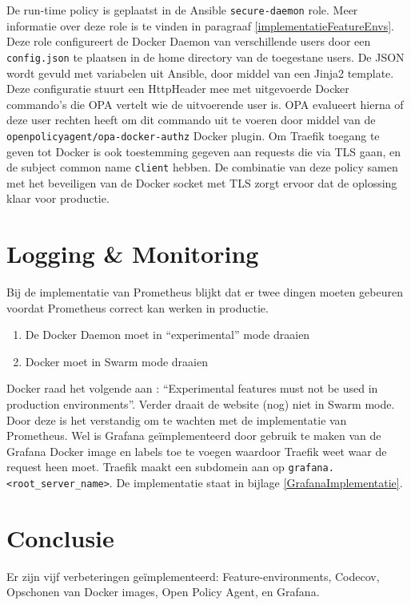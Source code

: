 De run-time policy is geplaatst in de Ansible \texttt{secure-daemon} role. Meer informatie over deze role is te vinden in paragraaf \ref{implementatieFeatureEnvs}. Deze role configureert de Docker Daemon van verschillende users door een \texttt{config.json} te plaatsen in de home directory van de toegestane users. De JSON wordt gevuld met variabelen uit Ansible, door middel van een Jinja2 template. Deze configuratie stuurt een HttpHeader mee met uitgevoerde Docker commando's die OPA vertelt wie de uitvoerende user is. OPA evalueert hierna of deze user rechten heeft om dit commando uit te voeren door middel van de \texttt{openpolicyagent/opa-docker-authz} Docker plugin. Om Traefik toegang te geven tot Docker is ook toestemming gegeven aan requests die via TLS gaan, en de subject common name \texttt{client} hebben. De combinatie van deze policy samen met het beveiligen van de Docker socket met TLS zorgt ervoor dat de oplossing klaar voor productie.

\section{Logging \& Monitoring} \label{loggingmonitoring}
Bij de implementatie van Prometheus blijkt dat er twee dingen moeten gebeuren voordat Prometheus correct kan werken in productie. 
\begin{enumerate}
    \item De Docker Daemon moet in \enquote{experimental} mode draaien
    \item Docker moet in Swarm mode draaien
\end{enumerate}
Docker raad het volgende aan \parencite{DockerExperimental}: \enquote{Experimental features must not be used in production environments}. Verder draait de website (nog) niet in Swarm mode. Door deze is het verstandig om te wachten met de implementatie van Prometheus. Wel is Grafana geïmplementeerd door gebruik te maken van de Grafana Docker image en labels toe te voegen waardoor Traefik weet waar de request heen moet. Traefik maakt een subdomein aan op \texttt{grafana.<root\_server\_name>}. De implementatie staat in bijlage \ref{GrafanaImplementatie}.

\section{Conclusie}

Er zijn vijf verbeteringen geïmplementeerd: Feature-environments, Codecov, Opschonen van Docker images, Open Policy Agent, en Grafana.

